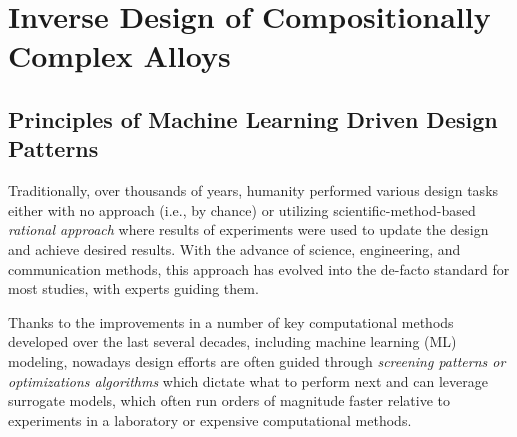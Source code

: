 \chapter{Inverse Design of Compositionally Complex Alloys} \label{chap:inversedesign}


\section{Principles of Machine Learning Driven Design Patterns} \label{inverse:sec:principles}

Traditionally, over thousands of years, humanity performed various design tasks either with no approach (i.e., by chance) or utilizing scientific-method-based \emph{rational approach} where results of experiments were used to update the design and achieve desired results. With the advance of science, engineering, and communication methods, this approach has evolved into the de-facto standard for most studies, with experts guiding them.

Thanks to the improvements in a number of key computational methods developed over the last several decades, including machine learning (ML) modeling, nowadays design efforts are often guided through \emph{screening patterns or optimizations algorithms} which dictate what to perform next and can leverage surrogate models, which often run orders of magnitude faster relative to experiments in a laboratory or expensive computational methods.

